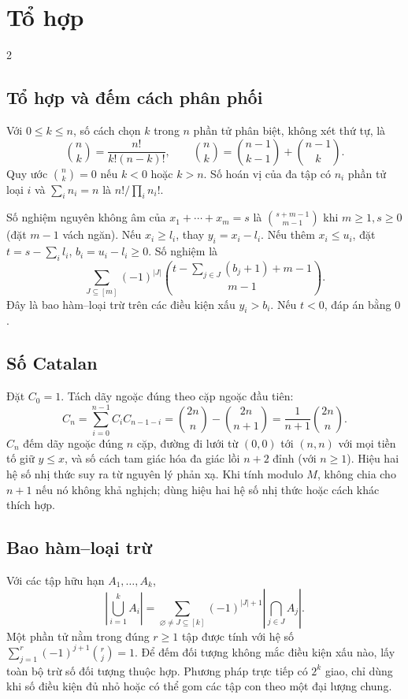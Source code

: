 \section{Tổ hợp}
\begingroup\small
\begin{multicols}{2}
\subsection{Tổ hợp và đếm cách phân phối}
Với $0\le k\le n$, số cách chọn $k$ trong $n$ phần tử phân biệt,
không xét thứ tự, là
\[
\binom nk=\frac{n!}{k!(n-k)!},\qquad
\binom nk=\binom{n-1}{k-1}+\binom{n-1}k.
\]
Quy ước $\binom nk=0$ nếu $k<0$ hoặc $k>n$.
Số hoán vị của đa tập có $n_i$ phần tử loại $i$ và
$\sum_i n_i=n$ là $n!/\prod_i n_i!$.

Số nghiệm nguyên không âm của $x_1+\cdots+x_m=s$ là
$\binom{s+m-1}{m-1}$ khi $m\ge1,s\ge0$ (đặt $m-1$ vách ngăn).
Nếu $x_i\ge l_i$, thay $y_i=x_i-l_i$.
Nếu thêm $x_i\le u_i$, đặt $t=s-\sum_i l_i$,
$b_i=u_i-l_i\ge0$. Số nghiệm là
\[
\sum_{J\subseteq[m]}(-1)^{|J|}
\binom{t-\sum_{j\in J}(b_j+1)+m-1}{m-1}.
\]
Đây là bao hàm--loại trừ trên các điều kiện xấu $y_i>b_i$.
Nếu $t<0$, đáp án bằng $0$.

\subsection{Số Catalan}
Đặt $C_0=1$. Tách dãy ngoặc đúng theo cặp ngoặc đầu tiên:
\[
C_n=\sum_{i=0}^{n-1}C_iC_{n-1-i}
=\binom{2n}{n}-\binom{2n}{n+1}
=\frac{1}{n+1}\binom{2n}{n}.
\]
$C_n$ đếm dãy ngoặc đúng $n$ cặp, đường đi lưới từ
$(0,0)$ tới $(n,n)$ với mọi tiền tố giữ $y\le x$,
và số cách tam giác hóa đa giác lồi $n+2$ đỉnh (với $n\ge1$).
Hiệu hai hệ số nhị thức suy ra từ nguyên lý phản xạ.
Khi tính modulo $M$, không chia cho $n+1$ nếu nó không khả nghịch;
dùng hiệu hai hệ số nhị thức hoặc cách khác thích hợp.

\subsection{Bao hàm--loại trừ}
Với các tập hữu hạn $A_1,\ldots,A_k$,
\[
\left|\bigcup_{i=1}^k A_i\right|=
\sum_{\varnothing\ne J\subseteq[k]}(-1)^{|J|+1}
\left|\bigcap_{j\in J}A_j\right|.
\]
Một phần tử nằm trong đúng $r\ge1$ tập được tính với hệ số
$\sum_{j=1}^r(-1)^{j+1}\binom rj=1$.
Để đếm đối tượng không mắc điều kiện xấu nào, lấy toàn bộ
trừ số đối tượng thuộc hợp. Phương pháp trực tiếp có $2^k$
giao, chỉ dùng khi số điều kiện đủ nhỏ hoặc có thể gom các
tập con theo một đại lượng chung.


\end{multicols}
